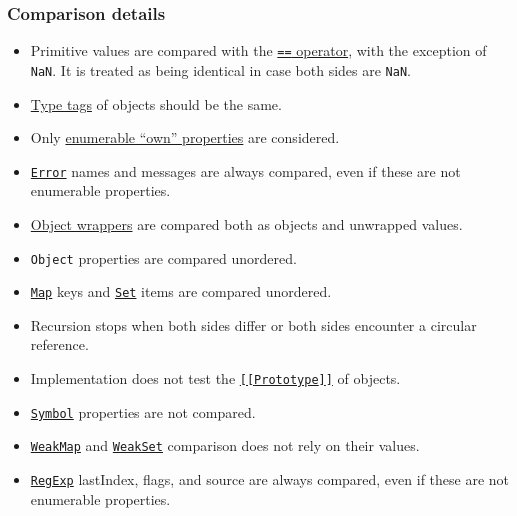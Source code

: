 \subsubsection{Comparison details}\label{comparison-details}

\begin{itemize}
\tightlist
\item
  Primitive values are compared with the
  \href{https://developer.mozilla.org/en-US/docs/Web/JavaScript/Reference/Operators/Equality}{\texttt{==}
  operator}, with the exception of \texttt{NaN}. It is treated as being
  identical in case both sides are \texttt{NaN}.
\item
  \href{https://tc39.github.io/ecma262/\#sec-object.prototype.tostring}{Type
  tags} of objects should be the same.
\item
  Only
  \href{https://developer.mozilla.org/en-US/docs/Web/JavaScript/Enumerability_and_ownership_of_properties}{enumerable
  ``own'' properties} are considered.
\item
  \href{errors.md\#class-error}{\texttt{Error}} names and messages are
  always compared, even if these are not enumerable properties.
\item
  \href{https://developer.mozilla.org/en-US/docs/Glossary/Primitive\#Primitive_wrapper_objects_in_JavaScript}{Object
  wrappers} are compared both as objects and unwrapped values.
\item
  \texttt{Object} properties are compared unordered.
\item
  \href{https://developer.mozilla.org/en-US/docs/Web/JavaScript/Reference/Global_Objects/Map}{\texttt{Map}}
  keys and
  \href{https://developer.mozilla.org/en-US/docs/Web/JavaScript/Reference/Global_Objects/Set}{\texttt{Set}}
  items are compared unordered.
\item
  Recursion stops when both sides differ or both sides encounter a
  circular reference.
\item
  Implementation does not test the
  \href{https://tc39.github.io/ecma262/\#sec-ordinary-object-internal-methods-and-internal-slots}{\texttt{{[}{[}Prototype{]}{]}}}
  of objects.
\item
  \href{https://developer.mozilla.org/en-US/docs/Web/JavaScript/Reference/Global_Objects/Symbol}{\texttt{Symbol}}
  properties are not compared.
\item
  \href{https://developer.mozilla.org/en-US/docs/Web/JavaScript/Reference/Global_Objects/WeakMap}{\texttt{WeakMap}}
  and
  \href{https://developer.mozilla.org/en-US/docs/Web/JavaScript/Reference/Global_Objects/WeakSet}{\texttt{WeakSet}}
  comparison does not rely on their values.
\item
  \href{https://developer.mozilla.org/en-US/docs/Web/JavaScript/Guide/Regular_Expressions}{\texttt{RegExp}}
  lastIndex, flags, and source are always compared, even if these are
  not enumerable properties.
\end{itemize}

